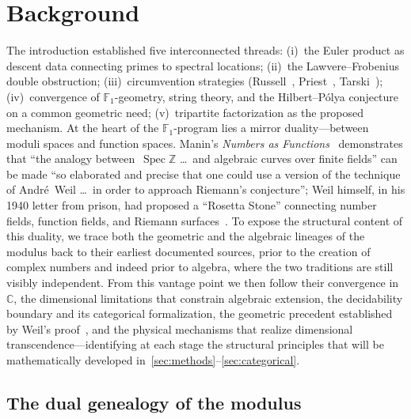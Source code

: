 \section{Background}\label{sec:background}

The introduction established five interconnected threads: (i)~the
Euler product as descent data connecting primes to spectral locations;
(ii)~the Lawvere--Frobenius double obstruction; (iii)~circumvention
strategies (Russell~\cite{russell03}, Priest~\cite{priest79}, Tarski~\cite{tarski52}); (iv)~convergence of
$\mathbb{F}_1$-geometry, string theory, and the Hilbert--P\'olya
conjecture on a common geometric need; (v)~tripartite factorization
as the proposed mechanism.  At the heart of the
$\mathbb{F}_1$-program lies a mirror duality---between moduli spaces
and function spaces. Manin's \emph{Numbers as Functions}~\cite{manin13}
demonstrates that ``the analogy
between~$\operatorname{Spec}\mathbb{Z}$ \ldots\ and algebraic curves
over finite fields'' can be made ``so elaborated and precise that one
could use a version of the technique of Andr\'e~Weil \ldots\ in order
to approach Riemann's conjecture''; Weil himself, in his 1940 letter
from prison, had proposed a ``Rosetta Stone'' connecting number fields,
function fields, and Riemann
surfaces~\cite{weil_letter40,milne15}.
To expose the structural content of this duality, we trace both
the geometric and the algebraic lineages of the modulus back to their
earliest documented sources, prior to the creation of complex numbers
and indeed prior to algebra, where the two traditions are still
visibly independent.  From this vantage point we then follow their
convergence in~$\mathbb{C}$, the dimensional limitations that
constrain algebraic extension, the decidability boundary and its
categorical formalization, the geometric precedent established by
Weil's proof~\cite{weil48}, and the physical mechanisms that realize dimensional
transcendence---identifying at each stage the structural principles
that will be mathematically developed in~\cref{sec:methods}--\cref{sec:categorical}.



\subsection{The dual genealogy of the modulus}\label{ssec:modulus}


